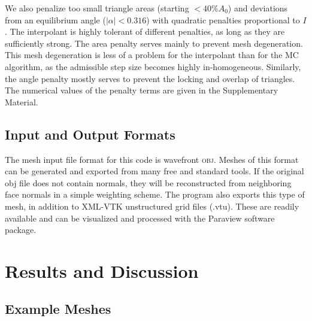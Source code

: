 \documentclass[twocolumn]{biophys-new}
\begin{document}
We also penalize too small triangle areas (starting $<40 \% A_0$) and deviations from an equilibrium angle ($|\alpha| < 0.316$) with quadratic penalties proportional to $I$. The interpolant is highly tolerant of different penalties, as long as they are sufficiently strong. The area penalty serves mainly to prevent mesh degeneration. This mesh degeneration is less of a problem for the interpolant than for the MC algorithm, as the admissible step size becomes highly in-homogeneous. Similarly, the angle penalty mostly serves to prevent the locking and overlap of triangles. The numerical values of the penalty terms are given in the Supplementary Material.

\subsection*{Input and Output Formats}

The mesh input file format for this code is wavefront \textsc{obj}. Meshes of this format can be generated and exported from many free and standard tools. If the original obj file does not contain normals, they will be reconstructed from neighboring face normals in a simple weighting scheme\cite{Max1}.
The program also exports this type of mesh, in addition to \textsc{XML}-\textsc{VTK}\cite{vtkpara} unstructured grid files (.vtu). These are readily available and can be visualized and processed with the Paraview software package\cite{paraview}. 

\section*{Results and Discussion}
\subsection*{Example Meshes}
\end{document}
